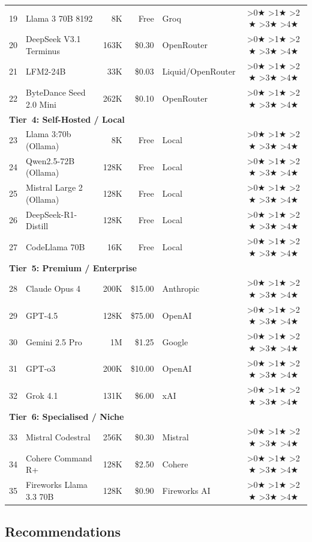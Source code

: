 \documentclass[11pt,a4paper]{article}
\newcommand{\stars}[1]{%
  \ifnum#1>0\relax\ensuremath{\bigstar}\fi%
  \ifnum#1>1\relax\ensuremath{\bigstar}\fi%
  \ifnum#1>2\relax\ensuremath{\bigstar}\fi%
  \ifnum#1>3\relax\ensuremath{\bigstar}\fi%
  \ifnum#1>4\relax\ensuremath{\bigstar}\fi%
}
\begin{document}
{\begin{longtable}{rlrrp{2.5cm}c}
19 & Llama 3 70B 8192           & 8K     & Free    & Groq             & \stars{2} \\
20 & DeepSeek V3.1 Terminus     & 163K   & \$0.30  & OpenRouter       & \stars{3} \\
21 & LFM2-24B                   & 33K    & \$0.03  & Liquid/OpenRouter& \stars{2} \\
22 & ByteDance Seed 2.0 Mini    & 262K   & \$0.10  & OpenRouter       & \stars{3} \\
\midrule
\multicolumn{6}{l}{\textbf{Tier~4: Self-Hosted / Local}} \\
\midrule
23 & Llama 3:70b (Ollama)       & 8K     & Free    & Local            & \stars{3} \\
24 & Qwen2.5-72B (Ollama)       & 128K   & Free    & Local            & \stars{3} \\
25 & Mistral Large 2 (Ollama)   & 128K   & Free    & Local            & \stars{3} \\
26 & DeepSeek-R1-Distill        & 128K   & Free    & Local            & \stars{3} \\
27 & CodeLlama 70B              & 16K    & Free    & Local            & \stars{2} \\
\midrule
\multicolumn{6}{l}{\textbf{Tier~5: Premium / Enterprise}} \\
\midrule
28 & Claude Opus 4              & 200K   & \$15.00 & Anthropic        & \stars{5} \\
29 & GPT-4.5                    & 128K   & \$75.00 & OpenAI           & \stars{4} \\
30 & Gemini 2.5 Pro             & 1M     & \$1.25  & Google           & \stars{5} \\
31 & GPT-o3                     & 200K   & \$10.00 & OpenAI           & \stars{4} \\
32 & Grok 4.1                   & 131K   & \$6.00  & xAI              & \stars{4} \\
\midrule
\multicolumn{6}{l}{\textbf{Tier~6: Specialised / Niche}} \\
\midrule
33 & Mistral Codestral          & 256K   & \$0.30  & Mistral          & \stars{3} \\
34 & Cohere Command R+          & 128K   & \$2.50  & Cohere           & \stars{3} \\
35 & Fireworks Llama 3.3 70B    & 128K   & \$0.90  & Fireworks AI     & \stars{3} \\
\end{longtable}
}

\subsection{Recommendations}
\end{document}
